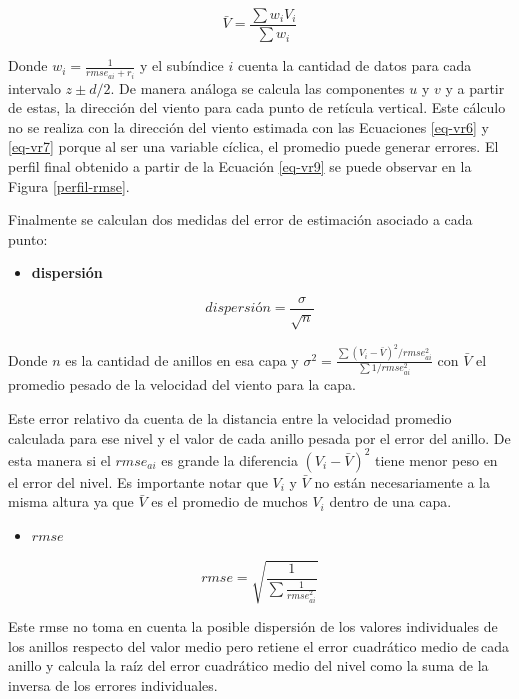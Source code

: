 \documentclass[12pt,spanish,oneside, a4paper]{book}
\providecommand{\tightlist}{%
  \setlength{\itemsep}{0pt}\setlength{\parskip}{0pt}}
\begin{document}
\begin{equation}\label{eq-vr9}
\bar{V} = \frac {\sum w_i V_i} {\sum w_i}
\end{equation}

Donde \(w_i = \frac {1}{rmse_{ai} + r_i}\) y el subíndice \(i\) cuenta
la cantidad de datos para cada intervalo \(z \pm d/2\). De manera
análoga se calcula las componentes \(u\) y \(v\) y a partir de estas, la
dirección del viento para cada punto de retícula vertical. Este cálculo
no se realiza con la dirección del viento estimada con las Ecuaciones
\ref{eq-vr6} y \ref{eq-vr7} porque al ser una variable cíclica, el
promedio puede generar errores. El perfil final obtenido a partir de la
Ecuación \ref{eq-vr9} se puede observar en la Figura \ref{perfil-rmse}.

Finalmente se calculan dos medidas del error de estimación asociado a
cada punto:

\begin{itemize}
\tightlist
\item
  \textbf{dispersión}
\end{itemize}

\begin{equation}\label{eq-vr10} 
dispersión = \frac{\sigma}{\sqrt{n}}
\end{equation}

Donde \(n\) es la cantidad de anillos en esa capa y
\(\sigma^{2}= \frac{\sum (V_i - \bar{V})^2 /rmse_{ai}^2}{\sum 1/rmse_{ai}^2}\)
con \(\bar{V}\) el promedio pesado de la velocidad del viento para la
capa.

Este error relativo da cuenta de la distancia entre la velocidad
promedio calculada para ese nivel y el valor de cada anillo pesada por
el error del anillo. De esta manera si el \(rmse_{ai}\) es grande la
diferencia \((V_i - \bar{V})^2\) tiene menor peso en el error del nivel.
Es importante notar que \(V_i\) y \(\bar{V}\) no están necesariamente a
la misma altura ya que \(\bar{V}\) es el promedio de muchos \(V_i\)
dentro de una capa.

\begin{itemize}
\tightlist
\item
  \textbf{\(rmse\)}
\end{itemize}

\begin{equation}\label{eq-vr11}
rmse = \sqrt{\frac{1}{\sum \frac{1}{rmse_{ai}^2}}}
\end{equation}

Este rmse no toma en cuenta la posible dispersión de los valores
individuales de los anillos respecto del valor medio pero retiene el
error cuadrático medio de cada anillo y calcula la raíz del error
cuadrático medio del nivel como la suma de la inversa de los errores
individuales.
\end{document}
